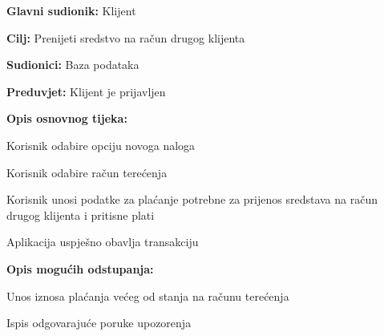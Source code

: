     			
    				\noindent {}
    			\begin{packed_item}
    				
    				\item \textbf{Glavni sudionik: }Klijent
    				\item  \textbf{Cilj:} Prenijeti sredstvo na račun drugog klijenta
    				\item  \textbf{Sudionici:} Baza podataka
    				\item  \textbf{Preduvjet:} Klijent je prijavljen
    				\item  \textbf{Opis osnovnog tijeka:}
    				
    				\item[] \begin{packed_enum}
    					
    					\item Korisnik odabire opciju novoga naloga
    					\item Korisnik odabire račun terećenja 
    					\item Korisnik unosi podatke za plaćanje potrebne za prijenos sredstava na račun drugog klijenta i pritisne plati
    					\item Aplikacija uspješno obavlja transakciju 
    					
    				\end{packed_enum}
    					
    					\item  \textbf{Opis mogućih odstupanja:}
    					
    					\item[] \begin{packed_item}
    						
    						\item[3.a] Unos iznosa plaćanja većeg od stanja na računu terećenja
    						\item[] \begin{packed_enum}
    							
    							\item Ispis odgovarajuće poruke upozorenja
    							
    							
    						\end{packed_enum}
    						
    						
    					\end{packed_item}
    					
    				
    				
    			\end{packed_item}
    		

